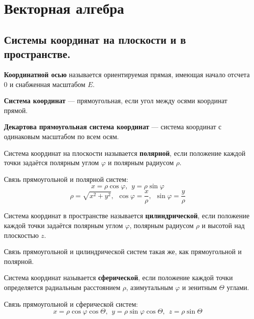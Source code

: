 

\usepackage{gensymb}
\usepackage{ulem}
\usepackage{sectsty}
\usepackage{tensor}

\subsectionfont{\fontsize{14}{15}\selectfont}
\setlength{\parindent}{0pt}

\cfoot{}

\DeclarePairedDelimiter\Bracket{\lbrack}{\rbrack}

\newcommand{\doref}[1]{Дано выше. \textit{(\ref{#1}, стр. \pageref{#1})}}
\newcommand\Warning{%
 \makebox[1.4em][c]{%
 \makebox[0pt][c]{\raisebox{.1em}{\small!}}%
 \makebox[0pt][c]{\color{red}\Large$\bigtriangleup$}}}%


\section{Векторная алгебра}
\subsection{Системы координат на плоскости и в пространстве.}
\begin{definition}
    \textbf{Координатной осью} называется ориентируемая прямая, имеющая начало отсчета $0$ и снабженная масштабом $E$.
\end{definition}
\begin{definition}
    \textbf{Система координат} --- прямоугольная, если угол между осями координат прямой.
\end{definition}
\begin{definition}
    \textbf{Декартова прямоугольная система координат} --- система координат с одинаковым масштабом по всем осям.
\end{definition}
\begin{definition}
    Система координат на плоскости называется \textbf{полярной}, если положение каждой точки задаётся полярным углом $\varphi$ и полярным радиусом $\rho$.
\end{definition}
Связь прямоугольной и полярной систем:
$$x=\rho\cos\varphi,\ \ y=\rho\sin\varphi$$
$$\rho=\sqrt{x^2+y^2},\ \ \cos\varphi=\frac{x}{\rho},\ \ \sin\varphi=\frac{y}{\rho}$$
\begin{definition}
    Система координат в пространстве называется \textbf{цилиндрической}, если положение каждой точки задаётся полярным углом $\varphi$, полярным радиусом $\rho$ и высотой над плоскостью $z$.
\end{definition}
Связь прямоугольной и цилиндрической систем такая же, как прямоугольной и полярной.
\begin{definition}
    Система координат называется \textbf{сферической}, если положение каждой точки определяется радиальным расстоянием $\rho$, азимутальным $\varphi$ и зенитным $\Theta$ углами.
\end{definition}
Связь прямоугольной и сферической систем:
$$x=\rho\cos\varphi\cos\Theta, \ \ y=\rho\sin\varphi\cos\Theta, \ \ z=\rho\sin\Theta$$
